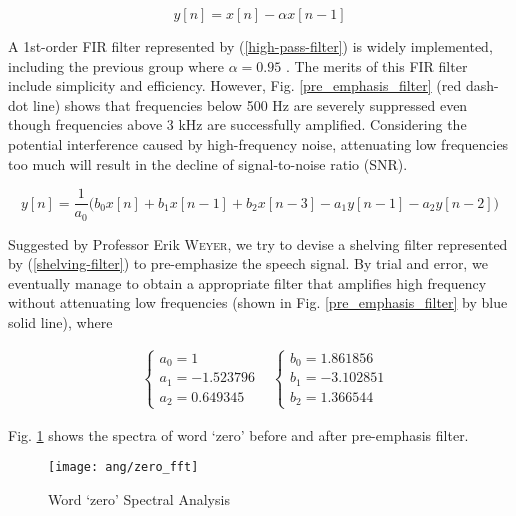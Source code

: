 \begin{equation}
\label{high-pass-filter}
y[n] = x[n] - \alpha x[n-1]
\end{equation}

A 1st-order FIR filter represented by (\ref{high-pass-filter}) is widely implemented, including the previous group where $\alpha = 0.95$ \cite{EVW-report}. The merits of this FIR filter include simplicity and efficiency. However, Fig. \ref{pre_emphasis_filter} (red dash-dot line) shows that frequencies below 500 Hz are severely suppressed even though frequencies above 3 kHz are successfully amplified. Considering the potential interference caused by high-frequency noise, attenuating low frequencies too much will result in the decline of signal-to-noise ratio (SNR).

\begin{equation}
\label{shelving-filter}
y[n] = \frac{1}{a_0} \big( b_0 x[n] + b_1 x[n-1] + b_2 x[n-3] - a_1 y[n-1] - a_2 y[n-2] \big)
\end{equation}

Suggested by Professor Erik \textsc{Weyer}, we try to devise a shelving filter represented by (\ref{shelving-filter}) to pre-emphasize the speech signal. By trial and error, we eventually manage to obtain a appropriate filter that amplifies high frequency without attenuating low frequencies (shown in Fig. \ref{pre_emphasis_filter} by blue solid line), where

\begin{align}
\label{shleving-coef}
&\begin{cases}
a_0 = 1\\
a_1 = -1.523796\\
a_2 = 0.649345
\end{cases}
&\begin{cases}
b_0 = 1.861856\\
b_1 = -3.102851\\
b_2 = 1.366544
\end{cases}
\end{align}

Fig. \ref{zero_fft} shows the spectra of word `zero' before and after pre-emphasis filter.

\begin{figure}[H]
\centering
\texttt{[image: ang/zero\_fft]}
\caption{Word `zero' Spectral Analysis}
\label{zero_fft}
\end{figure}


